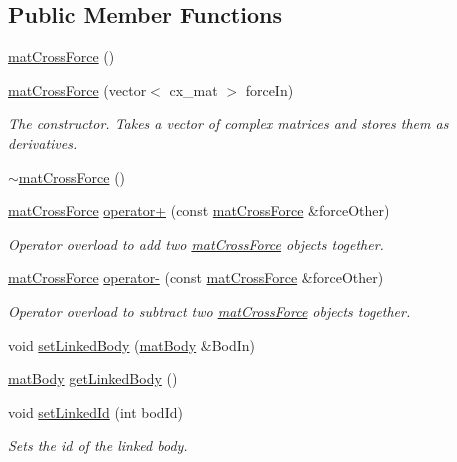 \subsection*{Public Member Functions}
\begin{DoxyCompactItemize}
\item 
\hyperlink{classmat_cross_force_a11abe5f2ba38beb3c85645557a21cf80}{mat\-Cross\-Force} ()
\item 
\hyperlink{classmat_cross_force_ab74a2bae3db92487eb022be166147711}{mat\-Cross\-Force} (vector$<$ cx\-\_\-mat $>$ force\-In)
\begin{DoxyCompactList}\small\item\em The constructor. Takes a vector of complex matrices and stores them as derivatives. \end{DoxyCompactList}\item 
\hyperlink{classmat_cross_force_a92013c8d5347ffcf90629541d26a247c}{$\sim$mat\-Cross\-Force} ()
\item 
\hyperlink{classmat_cross_force}{mat\-Cross\-Force} \hyperlink{classmat_cross_force_ae08bed0375d872e33a128b2e70224e6d}{operator+} (const \hyperlink{classmat_cross_force}{mat\-Cross\-Force} \&force\-Other)
\begin{DoxyCompactList}\small\item\em Operator overload to add two \hyperlink{classmat_cross_force}{mat\-Cross\-Force} objects together. \end{DoxyCompactList}\item 
\hyperlink{classmat_cross_force}{mat\-Cross\-Force} \hyperlink{classmat_cross_force_ae0d2f74c5c7a615e93ba523fe86275b0}{operator-\/} (const \hyperlink{classmat_cross_force}{mat\-Cross\-Force} \&force\-Other)
\begin{DoxyCompactList}\small\item\em Operator overload to subtract two \hyperlink{classmat_cross_force}{mat\-Cross\-Force} objects together. \end{DoxyCompactList}\item 
void \hyperlink{classmat_cross_force_af5affd28ed65f7974eb0ca38930b75a2}{set\-Linked\-Body} (\hyperlink{classmat_body}{mat\-Body} \&Bod\-In)
\item 
\hyperlink{classmat_body}{mat\-Body} \hyperlink{classmat_cross_force_adabf398d7bd888dd672a6abc0fdf0354}{get\-Linked\-Body} ()
\item 
void \hyperlink{classmat_cross_force_a37b010f0666d4f904b906f39aa0e29ed}{set\-Linked\-Id} (int bod\-Id)
\begin{DoxyCompactList}\small\item\em Sets the id of the linked body. \end{DoxyCompactList}\item 

\end{DoxyCompactItemize}
